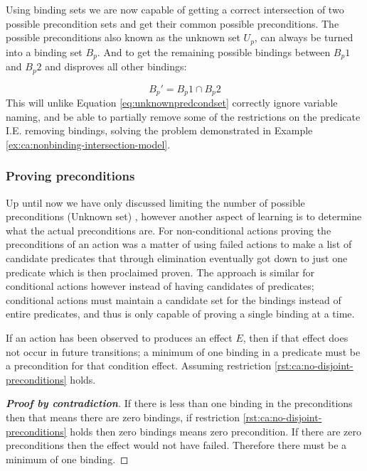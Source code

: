 \documentclass[../Master.tex]{subfiles}
\begin{document}
Using binding sets we are now capable of getting a correct intersection of two possible precondition sets and get their common possible preconditions. The possible preconditions also known as the unknown set $U_p$, can always be turned into a binding set $B_p$.
And to get the remaining possible bindings between $B_p1$ and $B_p2$ and disproves all other bindings:

\begin{equation}
B_p' = B_p1 \cap B_p2
\end{equation}
This will unlike Equation \ref{eq:unknownpredcondset} correctly ignore variable naming, and be able to partially remove some of the restrictions on the predicate I.E. removing bindings, solving the problem demonstrated in Example \ref{ex:ca:nonbinding-intersection-model}.

\subsubsection{Proving preconditions}
Up until now we have only discussed limiting the number of possible preconditions (Unknown set) , however another aspect of learning is to determine what the actual preconditions are.
For non-conditional actions proving the preconditions of an action was a matter of using failed actions to make a list of candidate predicates that through elimination eventually got down to just one predicate which is then proclaimed proven. The approach is similar for conditional actions however instead of having candidates of predicates; conditional actions must maintain a candidate set for the bindings instead of entire predicates, and thus is only capable of proving a single binding at a time.

\begin{theorem}\label{thm:minimum-one-binding}
	If an action has been observed to produces an effect $E$, then if that effect does not occur in future transitions;
	a minimum of one binding in a predicate must be a precondition for that condition effect. Assuming restriction \ref{rst:ca:no-disjoint-preconditions} holds.

	\begin{proof}[\textbf{Proof by contradiction}] If there is less than one binding in the preconditions then that means there are zero bindings, if restriction \ref{rst:ca:no-disjoint-preconditions} holds then zero bindings means zero precondition. If there are zero preconditions then the effect would not have failed. Therefore there must be a minimum of one binding. \qedhere
	\end{proof}
\end{theorem}
\end{document}
